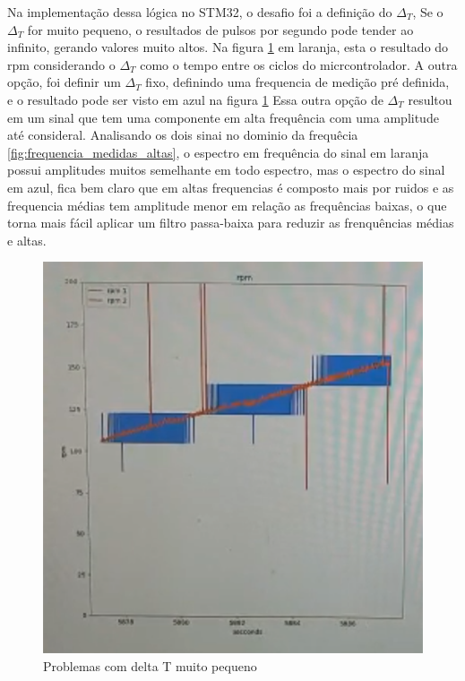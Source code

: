 Na implementação dessa lógica no STM32, o desafio foi a definição do $\Delta_{T}$,
Se o $\Delta_{T}$ for muito pequeno, o resultados de pulsos por segundo pode tender ao infinito, gerando valores muito altos.
Na figura \ref{fig:medidas_altas} em laranja, esta o resultado do rpm considerando o $\Delta_{T}$ como o tempo entre os ciclos do micrcontrolador.
A outra opção, foi definir um $\Delta_{T}$ fixo, definindo uma frequencia de medição pré definida, e o resultado pode ser visto em azul na figura \ref{fig:medidas_altas}
Essa outra opção de $\Delta_{T}$ resultou em um sinal que tem uma componente em alta frequência com uma amplitude até consideral.
Analisando os dois sinai no dominio da frequêcia \ref{fig:frequencia_medidas_altas}, o espectro em frequência do sinal em laranja possui amplitudes muitos semelhante em todo espectro, mas o espectro do sinal em azul, fica bem claro que em altas frequencias é composto mais por ruidos
e as frequencia médias tem amplitude menor em relação as frequências baixas, o que torna mais fácil aplicar um filtro passa-baixa para reduzir as frenquências médias e altas.


\begin{figure}[h]
	\centering
	\includegraphics{figures/medidas_altas}
	\caption{Problemas com delta T muito pequeno}
	\label{fig:medidas_altas}
\end{figure}


